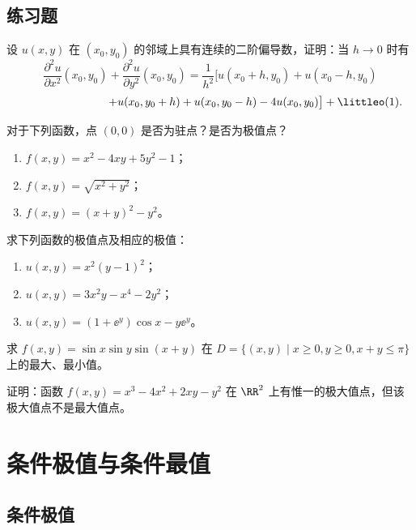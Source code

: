 \subsection{练习题}
\begin{xexercise}[1]
设 $u(x,y)$ 在 $(x_0,y_0)$ 的邻域上具有连续的二阶偏导数，证明：当 $h\to0$ 时有
  \[
    \frac{\partial^2u}{\partial x^2}(x_0,y_0)+\frac{\partial^2u}{\partial y^2}(x_0,y_0)
    =\frac1{h^2}\bigl[u(x_0+h,y_0)+u(x_0-h,y_0)
  \]
  \[
    \qquad\qquad\qquad\qquad
    +u(x_0,y_0+h)+u(x_0,y_0-h)-4u(x_0,y_0)\bigr]+\littleo(1).
  \]
\end{xexercise}

\begin{xexercise}[2]
对于下列函数，点 $(0,0)$ 是否为驻点？是否为极值点？
  \begin{enumerate}[label=(\arabic*)]
    \item $f(x,y)=x^2-4xy+5y^2-1$；
    \item $f(x,y)=\sqrt{x^2+y^2}$；
    \item $f(x,y)=(x+y)^2-y^2$。
  \end{enumerate}
\end{xexercise}

\begin{xexercise}[3]
求下列函数的极值点及相应的极值：
  \begin{enumerate}[label=(\arabic*)]
    \item $u(x,y)=x^2(y-1)^2$；
    \item $u(x,y)=3x^2y-x^4-2y^2$；
    \item $u(x,y)=(1+\ee^y)\cos x-y\ee^y$。
  \end{enumerate}
\end{xexercise}

\begin{xexercise}[4]
求 $f(x,y)=\sin x\sin y\sin(x+y)$ 在 $D=\{(x,y)\mid x\ge0,y\ge0,x+y\le\pi\}$ 上的最大、最小值。
\end{xexercise}

\begin{xexercise}[5]
证明：函数 $f(x,y)=x^3-4x^2+2xy-y^2$ 在 $\RR^2$ 上有惟一的极大值点，但该极大值点不是最大值点。
\end{xexercise}

\section{条件极值与条件最值}

\subsection{条件极值}

